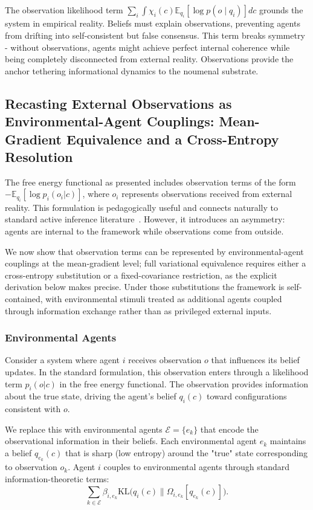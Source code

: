 \documentclass[11pt]{article}
\begin{document}
The observation likelihood term $\sum_i \int \chi_i(c)  \mathbb{E}_{q_i}[\log p(o \mid q_i)]  dc$ grounds the system in empirical reality. Beliefs must explain observations, preventing agents from drifting into self-consistent but false consensus. This term breaks symmetry - without observations, agents might achieve perfect internal coherence while being completely disconnected from external reality. Observations provide the anchor tethering informational dynamics to the noumenal substrate.

\subsection{Recasting External Observations as Environmental-Agent Couplings: Mean-Gradient Equivalence and a Cross-Entropy Resolution}

The free energy functional as presented includes observation terms of the form $-\mathbb{E}_{q_i}[\log p_i(o_i|c)]$, where $o_i$ represents observations received from external reality. This formulation is pedagogically useful and connects naturally to standard active inference literature~\cite{Friston2010, parr2022active}. However, it introduces an asymmetry: agents are internal to the framework while observations come from outside.

We now show that observation terms can be represented by environmental-agent couplings at the mean-gradient level; full variational equivalence requires either a cross-entropy substitution or a fixed-covariance restriction, as the explicit derivation below makes precise. Under those substitutions the framework is self-contained, with environmental stimuli treated as additional agents coupled through information exchange rather than as privileged external inputs.

\subsubsection{Environmental Agents}

Consider a system where agent $i$ receives observation $o$ that influences its belief updates. In the standard formulation, this observation enters through a likelihood term $p_i(o|c)$ in the free energy functional. The observation provides information about the true state, driving the agent's belief $q_i(c)$ toward configurations consistent with $o$.

We replace this with environmental agents $\mathcal{E} = \{e_k\}$ that encode the observational information in their beliefs. Each environmental agent $e_k$ maintains a belief $q_{e_k}(c)$ that is sharp (low entropy) around the "true" state corresponding to observation $o_k$. Agent $i$ couples to environmental agents through standard information-theoretic terms:
\begin{equation}
\sum_{k \in \mathcal{E}} \beta_{i,e_k}  \mathrm{KL}\big(q_i(c) \| \Omega_{i,e_k}[q_{e_k}(c)]\big).
\end{equation}
\end{document}
